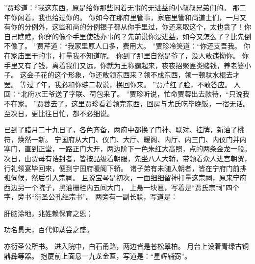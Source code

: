 ”贾珍道：“我这东西，原是给你那些闲着无事的无进益的小叔叔兄弟们的。
那二年你闲着，我也给过你的。
你如今在那府里管事，家庙里管和尚道士们，一月又有你的分例外，这些和尚的分例银子都从你手里过，你还来取这个，太也贪了！你自己瞧瞧，你穿的像个手里使钱办事的？先前说你没进益，如今又怎么了？比先倒不像了。
”贾芹道：“我家里原人口多，费用大。
”贾珍冷笑道：“你还支吾我。
你在家庙里干的事，打量我不知道呢。
你到了那里自然是爷了，没人敢违拗你。
你手里又有了钱，离着我们又远，你就为王称霸起来，夜夜招聚匪类赌钱，养老婆小子。
这会子花的这个形象，你还敢领东西来？领不成东西，领一顿驮水棍去才罢。
等过了年，我必和你琏二叔说，换回你来。
”贾芹红了脸，不敢答应。
人回：“北府水王爷送了字联、荷包来了。
”贾珍听说，忙命贾蓉出去款待，“只说我不在家。
”贾蓉去了，这里贾珍看着领完东西，回房与尤氏吃毕晚饭，一宿无话。
至次日，更比往日忙，都不必细说。
\par
已到了腊月二十九日了，各色齐备，两府中都换了门神、联对、挂牌，新油了桃符，焕然一新。
宁国府从大门、仪门、大厅、暖阁、内厅、内三门、内仪门并内塞门，直到正堂，一路正门大开，两边阶下一色朱红大高照，点的两条金龙一般。
次日，由贾母有诰封者，皆按品级着朝服，先坐八人大轿，带领着众人进宫朝贺，行礼领宴毕回来，便到宁国府暖阁下轿。
诸子弟有未随入朝者，皆在宁府门前排班伺候，然后引入宗祠。
且说宝琴是初次，一面细细留神打量这宗祠，原来宁府西边另一个院子，黑油栅栏内五间大门，
上悬一块匾，写着是“贾氏宗祠”四个字，旁书“衍圣公孔继宗书”。
两旁有一副长联，写道是：\par
\hop
肝脑涂地，兆姓赖保育之恩；\par
功名贯天，百代仰蒸尝之盛。
 \par
\hop
亦衍圣公所书。
进入院中，白石甬路，两边皆是苍松翠柏。
月台上设着青绿古铜鼎彝等器。
抱厦前上面悬一九龙金匾，写道是：“星辉辅弼”。

